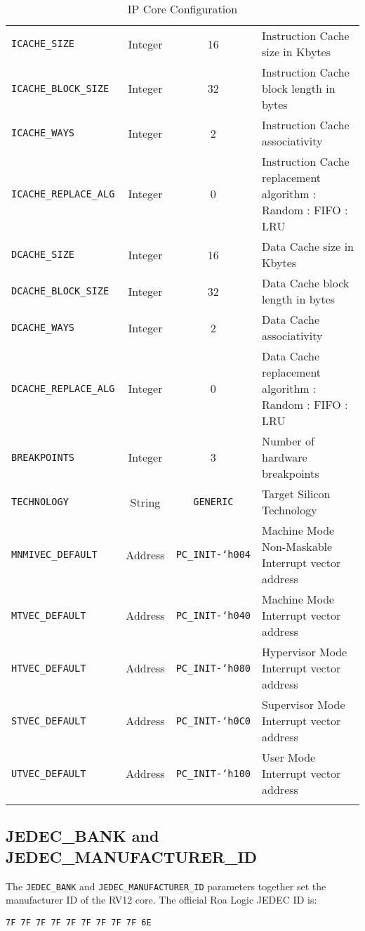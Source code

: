 \begin{longtable}[]{@{}lccp{6cm}@{}}
\texttt{ICACHE\_SIZE}            & Integer & 16                      & Instruction Cache size in Kbytes\tabularnewline
\texttt{ICACHE\_BLOCK\_SIZE}     & Integer & 32                      & Instruction Cache block length in bytes\tabularnewline
\texttt{ICACHE\_WAYS}            & Integer & 2                       & Instruction Cache associativity\tabularnewline
\texttt{ICACHE\_REPLACE\_ALG}    & Integer & 0                       & Instruction Cache replacement algorithm
\newline0: Random
\newline1: FIFO
\newline2: LRU\tabularnewline
\texttt{DCACHE\_SIZE}            & Integer & 16                      & Data Cache size in Kbytes\tabularnewline
\texttt{DCACHE\_BLOCK\_SIZE}     & Integer & 32                      & Data Cache block length in bytes\tabularnewline
\texttt{DCACHE\_WAYS}            & Integer & 2                       & Data Cache associativity\tabularnewline
\texttt{DCACHE\_REPLACE\_ALG}    & Integer & 0                       & Data Cache replacement algorithm
\newline0: Random
\newline1: FIFO
\newline2: LRU\tabularnewline
\texttt{BREAKPOINTS}             & Integer & 3                       & Number of hardware breakpoints\tabularnewline
\texttt{TECHNOLOGY}              & String  & \texttt{GENERIC}        & Target Silicon Technology\tabularnewline
\texttt{MNMIVEC\_DEFAULT}        & Address & \texttt{PC\_INIT-`h004} & Machine Mode Non-Maskable Interrupt vector address\tabularnewline
\texttt{MTVEC\_DEFAULT}          & Address & \texttt{PC\_INIT-`h040} & Machine Mode Interrupt vector address\tabularnewline
\texttt{HTVEC\_DEFAULT}          & Address & \texttt{PC\_INIT-`h080} & Hypervisor Mode Interrupt vector address\tabularnewline
\texttt{STVEC\_DEFAULT}          & Address & \texttt{PC\_INIT-`h0C0} & Supervisor Mode Interrupt vector address\tabularnewline
\texttt{UTVEC\_DEFAULT}          & Address & \texttt{PC\_INIT-`h100} & User Mode Interrupt vector address\tabularnewline
\bottomrule
\caption{IP Core Configuration}
\label{tab:ip-core-configuration}
\end{longtable}

\subsection{JEDEC\_BANK and JEDEC\_MANUFACTURER\_ID}

The \texttt{JEDEC\_BANK} and \texttt{JEDEC\_MANUFACTURER\_ID} parameters
together set the manufacturer ID of the RV12 core. The official Roa Logic JEDEC
ID is:

 \indent\indent\texttt{7F 7F 7F 7F 7F 7F 7F 7F 7F 6E}

